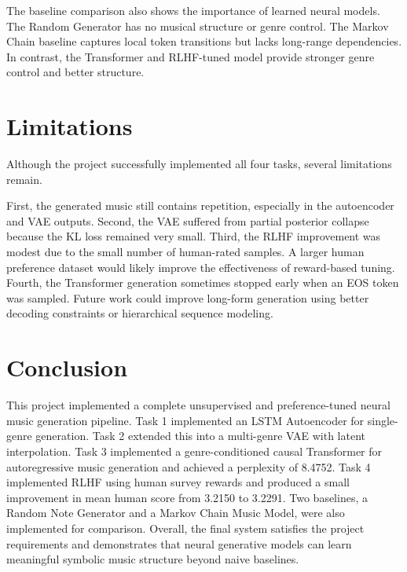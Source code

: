 \documentclass[conference]{IEEEtran}
\begin{document}
The baseline comparison also shows the importance of learned neural models. The Random Generator has no musical structure or genre control. The Markov Chain baseline captures local token transitions but lacks long-range dependencies. In contrast, the Transformer and RLHF-tuned model provide stronger genre control and better structure.

\section{Limitations}

Although the project successfully implemented all four tasks, several limitations remain.

First, the generated music still contains repetition, especially in the autoencoder and VAE outputs. Second, the VAE suffered from partial posterior collapse because the KL loss remained very small. Third, the RLHF improvement was modest due to the small number of human-rated samples. A larger human preference dataset would likely improve the effectiveness of reward-based tuning. Fourth, the Transformer generation sometimes stopped early when an EOS token was sampled. Future work could improve long-form generation using better decoding constraints or hierarchical sequence modeling.

\section{Conclusion}

This project implemented a complete unsupervised and preference-tuned neural music generation pipeline. Task 1 implemented an LSTM Autoencoder for single-genre generation. Task 2 extended this into a multi-genre VAE with latent interpolation. Task 3 implemented a genre-conditioned causal Transformer for autoregressive music generation and achieved a perplexity of 8.4752. Task 4 implemented RLHF using human survey rewards and produced a small improvement in mean human score from 3.2150 to 3.2291. Two baselines, a Random Note Generator and a Markov Chain Music Model, were also implemented for comparison. Overall, the final system satisfies the project requirements and demonstrates that neural generative models can learn meaningful symbolic music structure beyond naive baselines.
\end{document}
